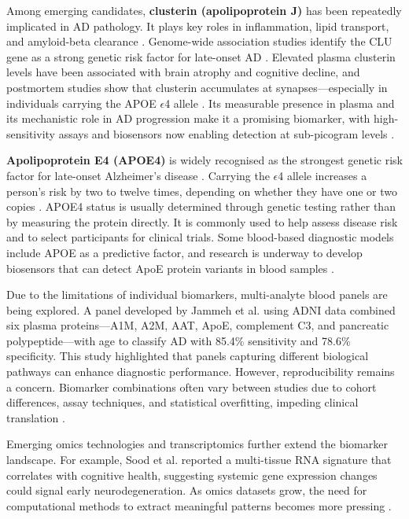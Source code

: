 \documentclass[a4paper,12pt]{article}
\begin{document}
Among emerging candidates, \textbf{clusterin (apolipoprotein J)} has been repeatedly implicated in AD pathology. It plays key roles in inflammation, lipid transport, and amyloid-beta clearance \cite{foster2019clusterin}. Genome-wide association studies identify the CLU gene as a strong genetic risk factor for late-onset AD \cite{milinkeviciute2023clusterin}. Elevated plasma clusterin levels have been associated with brain atrophy and cognitive decline, and postmortem studies show that clusterin accumulates at synapses—especially in individuals carrying the APOE $\epsilon$4 allele \cite{jackson2019clusterin}. Its measurable presence in plasma and its mechanistic role in AD progression make it a promising biomarker, with high-sensitivity assays and biosensors now enabling detection at sub-picogram levels \cite{foster2019clusterin}.

\textbf{Apolipoprotein E4 (APOE4)} is widely recognised as the strongest genetic risk factor for late-onset Alzheimer’s disease \cite{corder1993gene}. Carrying the $\epsilon$4 allele increases a person’s risk by two to twelve times, depending on whether they have one or two copies \cite{bilousova2019apolipoprotein}. APOE4 status is usually determined through genetic testing rather than by measuring the protein directly. It is commonly used to help assess disease risk and to select participants for clinical trials. Some blood-based diagnostic models include APOE as a predictive factor, and research is underway to develop biosensors that can detect ApoE protein variants in blood samples \cite{bungon2021graphene}.

Due to the limitations of individual biomarkers, multi-analyte blood panels are being explored. A panel developed by Jammeh et al. \cite{jammeh2016identification} using ADNI data combined six plasma proteins—A1M, A2M, AAT, ApoE, complement C3, and pancreatic polypeptide—with age to classify AD with 85.4\% sensitivity and 78.6\% specificity. This study highlighted that panels capturing different biological pathways can enhance diagnostic performance. However, reproducibility remains a concern. Biomarker combinations often vary between studies due to cohort differences, assay techniques, and statistical overfitting, impeding clinical translation \cite{hampel2018blood}.

Emerging omics technologies and transcriptomics further extend the biomarker landscape. For example, Sood et al. \cite{sood2015novel} reported a multi-tissue RNA signature that correlates with cognitive health, suggesting systemic gene expression changes could signal early neurodegeneration. As omics datasets grow, the need for computational methods to extract meaningful patterns becomes more pressing \cite{eteleeb2024brain}.
\end{document}
